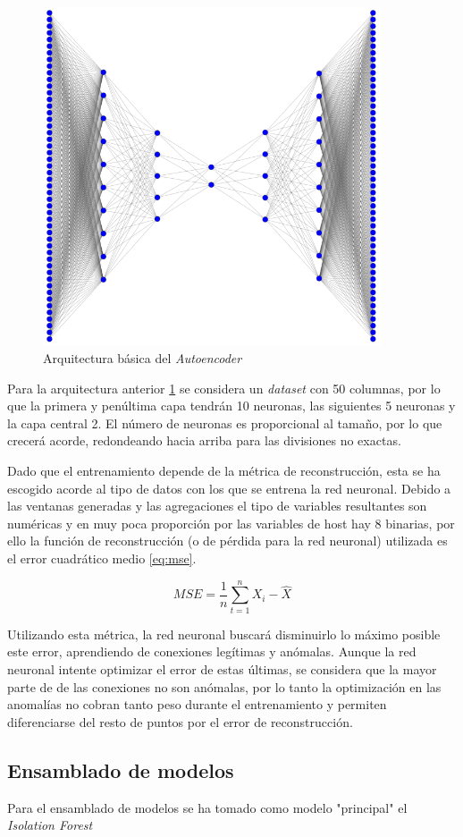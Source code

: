 \begin{figure}[h]
    \centering
    \includegraphics[width=10cm]{figs/ae_architecture.PNG}
    \caption{Arquitectura básica del \textit{Autoencoder}}
    \label{fig:ae_arch}
\end{figure}

Para la arquitectura anterior \ref{fig:ae_arch} se considera un \textit{dataset} con 50 columnas, por lo que la primera y penúltima capa tendrán 10 neuronas, las siguientes 5 neuronas y la capa central 2. El número de neuronas es proporcional al tamaño, por lo que crecerá acorde, redondeando hacia arriba para las divisiones no exactas.

Dado que el entrenamiento depende de la métrica de reconstrucción, esta se ha escogido acorde al tipo de datos con los que se entrena la red neuronal. Debido a las ventanas generadas y las agregaciones el tipo de variables resultantes son numéricas y en muy poca proporción por las variables de host hay 8 binarias, por ello la función de reconstrucción (o de pérdida para la red neuronal) utilizada es el error cuadrático medio \ref{eq:mse}.

\begin{equation}\label{eq:mse}
    MSE = \frac{1}{n}\sum_{t=1}^{n}X_i - \hat{X}
\end{equation}

Utilizando esta métrica, la red neuronal buscará disminuirlo lo máximo posible este error, aprendiendo de conexiones legítimas y anómalas. Aunque la red neuronal intente optimizar el error de estas últimas, se considera que la mayor parte de de las conexiones no son anómalas, por lo tanto la optimización en las anomalías no cobran tanto peso durante el entrenamiento y permiten diferenciarse del resto de puntos por el error de reconstrucción.

\subsection{Ensamblado de modelos}

Para el ensamblado de modelos se ha tomado como modelo "principal" el \textit{Isolation Forest}